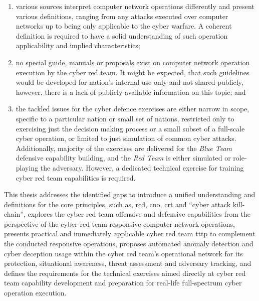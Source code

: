 \begin{enumerate}
    \item various sources interpret computer network operations differently and present various definitions, ranging from any attacks executed over computer networks up to being only applicable to the cyber warfare. A coherent definition is required to have a solid understanding of such operation applicability and implied characteristics;
    \item no special guide, manuals or proposals exist on computer network operation execution by the cyber red team. It might be expected, that such guidelines would be developed for nation's internal use only and not shared publicly, however, there is a lack of publicly available information on this topic; and
    \item the tackled issues for the cyber defence exercises are either narrow in scope, specific to a particular nation or small set of nations, restricted only to exercising just the decision making process or a small subset of a full-scale cyber operation, or limited to just simulation of common cyber attacks. Additionally, majority of the exercises are delivered for the \textit{Blue Team} defensive capability building, and the \textit{Red Team} is either simulated or role-playing the adversary. However, a dedicated technical exercise for training cyber red team capabilities is required.
\end{enumerate}

This thesis addresses the identified gaps to introduce
a unified understanding and definitions for the core principles, such as, \gls{rcd}, \gls{cno}, \gls{crt} and ``cyber attack kill-chain'',
explores the cyber red team offensive and defensive capabilities from the perspective of the cyber red team responsive computer network operations, 
presents practical and immediately applicable cyber red team \gls{tttp} to complement the conducted responsive operations,
proposes automated anomaly detection and cyber deception usage within the cyber red team's operational network for its protection, situational awareness, threat assessment and adversary tracking, and
defines the requirements for the technical exercises aimed directly at cyber red team capability development and preparation for real-life full-spectrum cyber operation execution.
